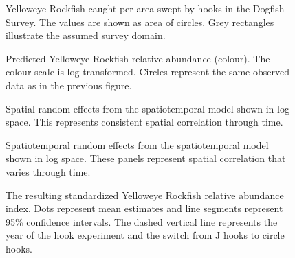 \documentclass[11pt]{book}
\begin{document}
\clearpage
\begin{figure}[htb]

{\centering {} 

}

\caption{Yelloweye Rockfish caught per area swept by hooks in the Dogfish Survey. The values are shown as area of circles. Grey rectangles illustrate the assumed survey domain.}\label{fig:dog-raw}
\end{figure}
\begin{figure}[htb]

{\centering {} 

}

\caption{Predicted Yelloweye Rockfish relative abundance (colour). The colour scale is log transformed. Circles represent the same observed data as in the previous figure.}\label{fig:dog-prediction}
\end{figure}
\begin{figure}[htb]

{\centering {} 

}

\caption{Spatial random effects from the spatiotemporal model shown in log space. This represents consistent spatial correlation through time.}\label{fig:dog-spatial}
\end{figure}
\begin{figure}[htb]

{\centering {} 

}

\caption{Spatiotemporal random effects from the spatiotemporal model shown in log space. These panels represent spatial correlation that varies through time.}\label{fig:dog-spatiotemporal}
\end{figure}
\begin{figure}[htb]

{\centering {} 

}

\caption{The resulting standardized Yelloweye Rockfish relative abundance index. Dots represent mean estimates and line segments represent 95\% confidence intervals. The dashed vertical line represents the year of the hook experiment and the switch from J hooks to circle hooks.}\label{fig:dog-standardized-index}
\end{figure}
\clearpage
\end{document}
